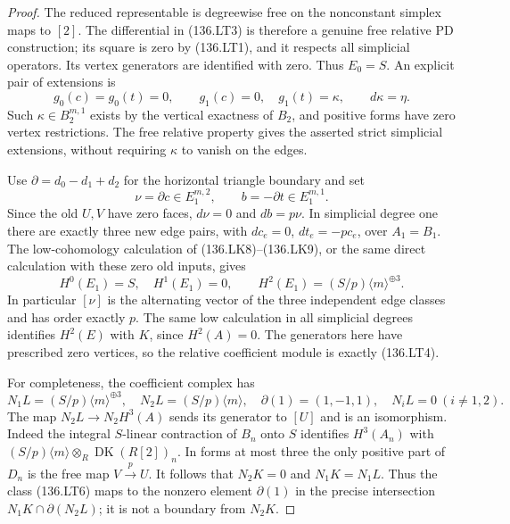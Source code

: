 \begin{proof}
The reduced representable is degreewise free on the nonconstant
simplex maps to \([2]\).  The differential in (136.LT3)
is therefore a genuine free relative PD construction; its square
is zero by (136.LT1), and it respects all simplicial operators.
Its vertex generators are identified with zero.  Thus \(E_0=S\).
An explicit pair of extensions is
\[
             g_0(c)=g_0(t)=0,
             \qquad g_1(c)=0,\quad g_1(t)=\kappa,
             \qquad d\kappa=\eta.
                                                               \tag{136.LT5}
\]
Such \(\kappa\in B_2^{m,1}\) exists by the vertical
exactness of \(B_2\), and positive forms have zero vertex
restrictions.  The free relative property gives the asserted
strict simplicial extensions, without requiring \(\kappa\)
to vanish on the edges.

Use \(\partial=d_0-d_1+d_2\) for the horizontal triangle
boundary and set
\[
                 \nu=\partial c\in E_1^{m,2},
                 \qquad b=-\partial t\in E_1^{m,1}.
                                                               \tag{136.LT6}
\]
Since the old \(U,V\) have zero faces,
\(d\nu=0\) and \(db=p\nu\).  In simplicial degree one
there are exactly three new edge pairs, with
\(dc_e=0\), \(dt_e=-pc_e\), over \(A_1=B_1\).
The low-cohomology calculation of (136.LK8)--(136.LK9), or
the same direct calculation with these zero old inputs, gives
\[
 H^0(E_1)=S,\quad H^1(E_1)=0,\qquad
 H^2(E_1)=(S/p)\langle m\rangle^{\oplus3}.
                                                               \tag{136.LT7}
\]
In particular \([\nu]\) is the alternating vector of
the three independent edge classes and has order exactly \(p\).
The same low calculation in all simplicial degrees identifies
\(H^2(E)\) with \(K\), since \(H^2(A)=0\).
The generators here have prescribed zero vertices, so the
relative coefficient module is exactly (136.LT4).

For completeness, the coefficient complex has
\[
 N_1L=(S/p)\langle m\rangle^{\oplus3},\quad
 N_2L=(S/p)\langle m\rangle,\quad
 \partial(1)=(1,-1,1),\quad N_iL=0\ (i\ne1,2).
                                                               \tag{136.LT8}
\]
The map \(N_2L\to N_2H^3(A)\) sends its generator to
\([U]\) and is an isomorphism.  Indeed the integral
\(S\)-linear contraction of \(B_n\) onto \(S\) identifies
\(H^3(A_n)\) with
\((S/p)\langle m\rangle\otimes_R
\operatorname{DK}(R[2])_n\).  In forms at most three the
only positive part of \(D_n\) is the free map \(V\xrightarrow{p}U\).
It follows that \(N_2K=0\) and \(N_1K=N_1L\).
Thus the class (136.LT6) maps to the nonzero element
\(\partial(1)\) in the precise intersection
\(N_1K\cap\partial(N_2L)\); it is not a boundary from
\(N_2K\).


\end{proof}
